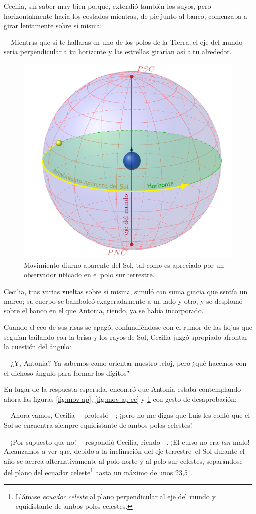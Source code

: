 Cecilia, sin saber muy bien porqué, extendió también los suyos, pero
horizontalmente hacia los costados mientras, de pie junto al banco,
comenzaba a girar lentamente sobre sí misma:

---Mientras que si te hallaras en uno de los polos de la Tierra, el
eje del mundo sería perpendicular a tu horizonte y las estrellas
girarían así a tu alrededor.

\begin{figure}[ht]
  \centering
  \includegraphics[width=.45\textwidth]{imagenes/movimiento-aparente-solar-polos}
  \caption{Movimiento diurno aparente del Sol, tal como es apreciado
    por un observador ubicado en el polo sur terrestre.}
  \label{fig:mov-ap-pol}
\end{figure}

Cecilia, tras varias vueltas sobre sí misma, simuló con suma gracia
que sentía un mareo; su cuerpo se bamboleó exageradamente a un lado y
otro, y se desplomó sobre el banco en el que Antonia, riendo, ya se
había incorporado.

Cuando el eco de sus risas se apagó, confundiéndose con el rumor de
las hojas que seguían bailando con la brisa y los rayos de Sol,
Cecilia juzgó apropiado afrontar la cuestión del ángulo:

---¿Y, Antonia? Ya sabemos cómo orientar nuestro reloj, pero ¿qué
hacemos con el dichoso ángulo para formar los dígitos?

En lugar de la respuesta esperada, encontró que Antonia estaba
contemplando ahora las figuras \ref{fig:mov-ap}, \ref{fig:mov-ap-ec} y
\ref{fig:mov-ap-pol} con gesto de desaprobación:

---Ahora vamos, Cecilia ---protestó---; ¡pero no me digas que Luis les
contó que el Sol se encuentra siempre equidistante de ambos polos
celestes!

---¡Por supuesto que no! ---respondió Cecilia, riendo---.  ¡El curso
no era \emph{tan} malo! Alcanzamos a ver que, debido a la inclinación
del eje terrestre, el Sol durante el año se acerca alternativamente al
polo norte y al polo sur celestes, separándose del plano del ecuador
celeste\footnote{Llámase \emph{ecuador celeste} al plano perpendicular
  al eje del mundo y equidistante de ambos polos celestes.} hasta un
máximo de unos 23,5$^{\circ}$.

